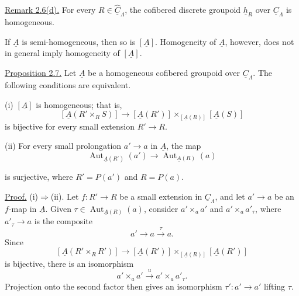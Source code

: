 \underline{Remark 2.6(d).} For every
$R\in\widehat{\underline C}_\Lambda$, the cofibered discrete
groupoid $\underline h_R$ over $\underline C_\Lambda$ is
homogeneous.

If $\underline A$ is semi-homogeneous, then so is $[\underline A]$.
Homogeneity of $\underline A$, however, does not in general imply
homogeneity of $[\underline A]$.

\underline{Proposition 2.7.} Let $\underline A$ be a homogeneous
cofibered groupoid over $\underline C_\Lambda$. The following
conditions are equivalent.

(i) $[\underline A]$ is homogeneous; that is,
\[
 [\underline A(R'\times_RS)]\longrightarrow
 [\underline A(R')]
 \times_{[\underline A(R)]}[\underline A(S)]
\]
is bijective for every small extension $R'\longrightarrow R$.

(ii) For every small prolongation $a'\longrightarrow a$ in
$\underline A$, the map
\[
 \operatorname{Aut}_{\underline A(R')}(a')
 \longrightarrow
 \operatorname{Aut}_{\underline A(R)}(a)
\]


is surjective, where $R'=P(a')$ and $R=P(a)$.

\underline{Proof.} (i)$\Rightarrow$(ii). Let
$f:R'\longrightarrow R$ be a small extension in
$\underline C_\Lambda$, and let $a'\longrightarrow a$ be an
$f$-map in $\underline A$. Given
$\tau\in\operatorname{Aut}_{\underline A(R)}(a)$, consider
$a'\times_a a'$ and $a'\times_a a'_\tau$, where
$a'_\tau\longrightarrow a$ is the composite
\[
 a'\longrightarrow a\xrightarrow{\ \tau\ }a.
\]
Since
\[
 [\underline A(R'\times_RR')]
 \longrightarrow
 [\underline A(R')]
 \times_{[\underline A(R)]}[\underline A(R')]
\]
is bijective, there is an isomorphism
\[
 a'\times_a a'\xrightarrow{\ u\ }a'\times_a a'_\tau.
\]
Projection onto the second factor then gives an isomorphism
$\tau':a'\longrightarrow a'$ lifting $\tau$.

